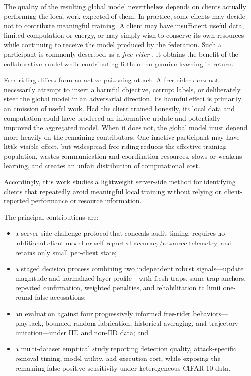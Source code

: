 \documentclass[conference]{IEEEtran}
\begin{document}
The quality of the resulting global model nevertheless depends on clients actually performing the local work expected of them. In practice, some clients may decide not to contribute meaningful training. A client may have insufficient useful data, limited computation or energy, or may simply wish to conserve its own resources while continuing to receive the model produced by the federation. Such a participant is commonly described as a \emph{free rider} \cite{lin2019freeriders,fraboni2021freerider}. It obtains the benefit of the collaborative model while contributing little or no genuine learning in return.

Free riding differs from an active poisoning attack. A free rider does not necessarily attempt to insert a harmful objective, corrupt labels, or deliberately steer the global model in an adversarial direction. Its harmful effect is primarily an omission of useful work. Had the client trained honestly, its local data and computation could have produced an informative update and potentially improved the aggregated model. When it does not, the global model must depend more heavily on the remaining contributors. One inactive participant may have little visible effect, but widespread free riding reduces the effective training population, wastes communication and coordination resources, slows or weakens learning, and creates an unfair distribution of computational cost.

Accordingly, this work studies a lightweight server-side method for identifying clients that repeatedly avoid meaningful local training without relying on client-reported performance or resource information.

The principal contributions are:
\begin{itemize}[leftmargin=*,nosep]
    \item a server-side challenge protocol that conceals audit timing, requires no additional client model or self-reported accuracy/resource telemetry, and retains only small per-client state;
    \item a staged decision process combining two independent robust signals---update magnitude and normalized layer profile---with fresh traps, same-trap anchors, repeated confirmation, weighted penalties, and rehabilitation to limit one-round false accusations;
    \item an evaluation against four progressively informed free-rider behaviors---playback, bounded-random fabrication, historical averaging, and trajectory imitation---under IID and non-IID data; and
    \item a multi-dataset empirical study reporting detection quality, attack-specific removal timing, model utility, and execution cost, while exposing the remaining false-positive sensitivity under heterogeneous CIFAR-10 data.
\end{itemize}
\end{document}

